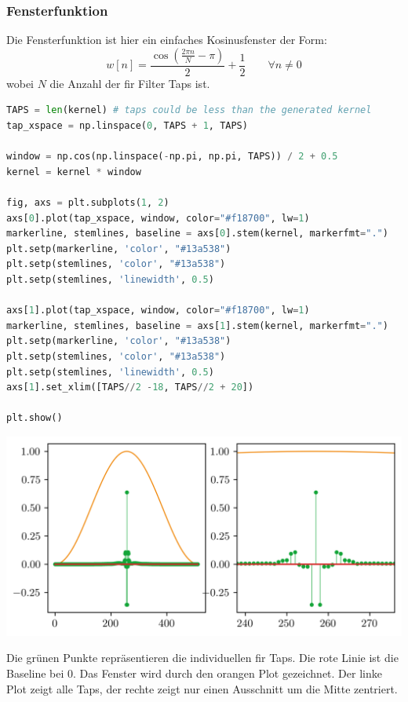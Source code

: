\hypertarget{fensterfunktion}{%
\subsubsection{Fensterfunktion}\label{fensterfunktion}}

Die Fensterfunktion ist hier ein einfaches Kosinusfenster der Form:
\[w[n] = \frac{\cos \left( \frac{2\pi n}{N}-\pi \right)}{2} + \frac{1}{2} \qquad \forall n \neq 0\]
wobei \(N\) die Anzahl der \gls{fir} Filter Taps ist.

\begin{lstlisting}[language=Python]
TAPS = len(kernel) # taps could be less than the generated kernel
tap_xspace = np.linspace(0, TAPS + 1, TAPS)

window = np.cos(np.linspace(-np.pi, np.pi, TAPS)) / 2 + 0.5
kernel = kernel * window

fig, axs = plt.subplots(1, 2)
axs[0].plot(tap_xspace, window, color="#f18700", lw=1)
markerline, stemlines, baseline = axs[0].stem(kernel, markerfmt=".")
plt.setp(markerline, 'color', "#13a538")
plt.setp(stemlines, 'color', "#13a538")
plt.setp(stemlines, 'linewidth', 0.5)

axs[1].plot(tap_xspace, window, color="#f18700", lw=1)
markerline, stemlines, baseline = axs[1].stem(kernel, markerfmt=".")
plt.setp(markerline, 'color', "#13a538")
plt.setp(stemlines, 'color', "#13a538")
plt.setp(stemlines, 'linewidth', 0.5)
axs[1].set_xlim([TAPS//2 -18, TAPS//2 + 20])

plt.show()
\end{lstlisting}

\includegraphics{./img/e8b13057814bcb33ac952b78683ccdd09dd04e39.png}

Die grünen Punkte repräsentieren die individuellen \gls{fir} Taps. Die
rote Linie ist die Baseline bei 0. Das Fenster wird durch den orangen
Plot gezeichnet. Der linke Plot zeigt alle Taps, der rechte zeigt nur
einen Ausschnitt um die Mitte zentriert.

